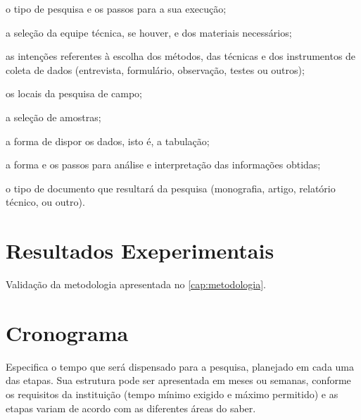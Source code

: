 \documentclass[12pt,oneside,a4paper,chapter=TITLE,section=TITLE,sumario=tradicional]{abntex2}
\begin{document}
\begin{lista}
    \item  o tipo de pesquisa e os passos para a sua execução;

    \item a seleção da equipe técnica, se houver, e dos materiais
necessários;

    \item as intenções referentes à escolha dos métodos, das técnicas
e dos instrumentos de coleta de dados (entrevista, formulário,
observação, testes ou outros);

    \item os locais da pesquisa de campo;

    \item a seleção de amostras;

    \item a forma de dispor os dados, isto é, a tabulação;

    \item a forma e os passos para análise e interpretação das
informações obtidas;

    \item o tipo de documento que resultará da pesquisa (monografia,
artigo, relatório técnico, ou outro).
\end{lista}

\chapter{Resultados Exeperimentais}
\label{cap:resultados}

Validação da metodologia apresentada no \autoref{cap:metodologia}.

\chapter{Cronograma}
\label{cap:cronograma}

Especifica o tempo que será dispensado para a pesquisa, planejado em cada uma 
das etapas. Sua estrutura pode ser apresentada em meses ou semanas, conforme os 
requisitos da instituição (tempo mínimo exigido e máximo permitido) e as etapas 
variam de acordo com as diferentes áreas do saber.
\end{document}
